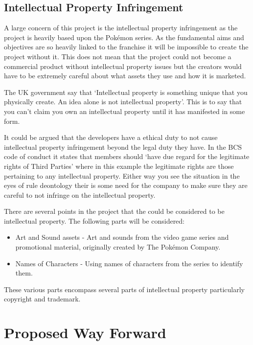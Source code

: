 \documentclass[a4paper]{article}
\newcommand{\Pokemon}{Pok\'{e}mon}
\begin{document}
\subsection{Intellectual Property Infringement}
A large concern of this project is the intellectual property infringement as the project is heavily based upon the \Pokemon{} series.
As the fundamental aims and objectives are so heavily linked to the franchise it will be impossible to create the project without it.
This does not mean that the project could not become a commercial product without intellectual property issues but the creators would have to be extremely careful about what assets they use and how it is marketed.
\par
The UK government say that `Intellectual property is something unique that you physically create. An idea alone is not intellectual property'\cite{ukGovIP}.
This is to say that you can't claim you own an intellectual property until it has manifested in some form.
\\ \par
It could be argued that the developers have a ethical duty to not cause intellectual property infringement beyond the legal duty they have.
In the BCS code of conduct it states that members should `have due regard for the legitimate rights of Third Parties'\cite{bscCoC} where in this example the legitimate rights are those pertaining to any intellectual property.
Either way you see the situation in the eyes of rule deontology their is some need for the company to make sure they are careful to not infringe on the intellectual property.
\\ \par
There are several points in the project that the could be considered to be intellectual property.
The following parts will be considered:
\begin{itemize}
    \item Art and Sound assets - Art and sounds from the video game series and promotional material, originally created by The \Pokemon{} Company.
    \item Names of Characters - Using names of characters from the series to identify them.
\end{itemize}
\par
These various parts encompass several parts of intellectual property particularly copyright and trademark.

\section{Proposed Way Forward}
\end{document}
